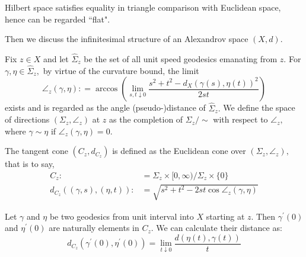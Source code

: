 \begin{rmk}[Example 2.1 c]
	Hilbert space satisfies equality in triangle comparison with Euclidean space, hence can be regarded ``flat".
\end{rmk}

Then we discuss the infinitesimal structure of an Alexandrov space \( ( X , d )\).

\begin{defn}
	Fix \( z \in X \) and let \( \hat { \Sigma } _ { z } \) be the set of all unit speed geodesics emanating from \( z \). For \( \gamma , \eta \in \hat { \Sigma } _ { z } , \) by virtue of the curvature bound, the limit
	\begin{equation}
		\label{angle_def}
		\angle _ { z } ( \gamma , \eta ): = \arccos \left( \lim _ { s , t \downarrow 0 } \frac { s ^ { 2 } + t ^ { 2 } - d _ { X }\left( \gamma ( s ) , \eta ( t ) \right) ^ { 2 } } { 2 s t } \right)
	\end{equation}
	exists and is regarded as the angle (pseudo-)distance of \( \hat { \Sigma } _ { z } . \) We define the space of directions \( \left( \Sigma _ { z } , \angle _ { z } \right) \) at \( z \) as the completion of \( \Sigma _ { z } / \sim \) with respect to \( \angle _ { z } , \) where \( \gamma \sim \eta \) if \( \angle _ { z } ( \gamma , \eta ) = 0 . \)
\end{defn}

\begin{defn}
	The tangent cone \( \left( C _ { z } , d _ { C _ { z } } \right) \) is defined as the Euclidean cone over \( \left( \Sigma _ { z } , \angle _ { z } \right) , \)
	that is to say,
	\begin{align*}
		C _ { z }:                                           & = \Sigma _ { z } \times [ 0 , \infty ) / \Sigma _ { z } \times \{ 0 \}          \\
		d _ { C _ { z } } ( ( \gamma , s ) , ( \eta , t ) ): & = \sqrt { s ^ { 2 } + t ^ { 2 } - 2 s t \cos \angle _ { z } ( \gamma , \eta ) }
	\end{align*}
\end{defn}

\begin{thm}
	Let $\gamma$ and  $\eta$ be two geodesics from unit interval into $X$ starting at $z$. Then $\gamma^\prime(0)$ and $\eta^\prime(0)$ are naturally elements in $C_z$. We can calculate their distance as:
	\[  d_{C_z}(\gamma^\prime(0),\eta^\prime(0))=\lim _ { t \downarrow 0 } \frac  {d ( \eta ( t ) , \gamma ( t ) )  }{ t }\]
\end{thm}

